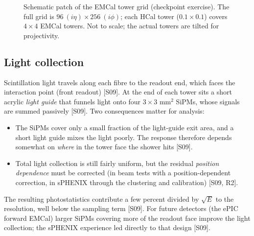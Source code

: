 \documentclass[11pt,letterpaper]{article}
\begin{document}
\begin{figure}[h]\centering
{}
\caption{Schematic patch of the EMCal tower grid (checkpoint exercise). The full grid is $96\ (i\eta)\times256\ (i\phi)$; each HCal tower ($0.1\times0.1$) covers $4\times4$ EMCal towers. Not to scale; the actual towers are tilted for projectivity.}\label{fig:grid}
\end{figure}

\subsection{Light collection}
Scintillation light travels along each fibre to the readout end, which faces the interaction point (front readout) [S09].
At the end of each tower sits a short acrylic \emph{light guide} that funnels light onto four $3\times3$ mm$^2$ SiPMs, whose signals are summed passively [S09].
Two consequences matter for analysis:
\begin{itemize}
\item The SiPMs cover only a small fraction of the light-guide exit area, and a short light guide mixes the light poorly. The response therefore depends somewhat on \emph{where} in the tower face the shower hits [S09].
\item Total light collection is still fairly uniform, but the residual \emph{position dependence} must be corrected (in beam tests with a position-dependent correction, in sPHENIX through the clustering and calibration) [S09, R2].
\end{itemize}
The resulting photostatistics contribute a few percent divided by $\sqrt{E}$ to the resolution, well below the sampling term [S09].
For future detectors (the ePIC forward EMCal) larger SiPMs covering more of the readout face improve the light collection; the sPHENIX experience led directly to that design [S09].
\end{document}
